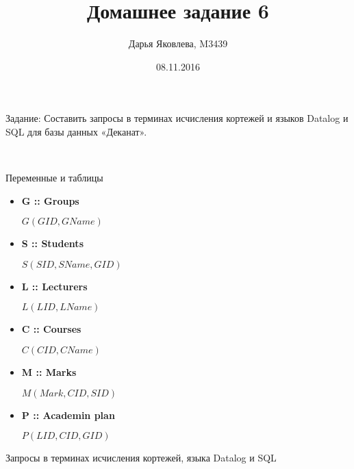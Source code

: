 \documentclass[12pt]{article}
\title{Домашнее задание 6}
\author{Дарья Яковлева, M3439}
\date{08.11.2016}
\begin{document}
\maketitle
\thispagestyle{empty}

Задание: Составить запросы в терминах исчисления кортежей и языков Datalog и SQL для базы данных «Деканат».

~~~

Переменные и таблицы
\begin{itemize}

	\item \textbf{G :: Groups}
	
		$G(GID, GName)$
	\item \textbf{S :: Students}
	
		$S(SID, SName, GID)$
	
	\item \textbf{L :: Lecturers}
	
		$L(LID, LName)$

	\item \textbf{C :: Courses}
	
		$C(CID, CName)$
		
	\item \textbf{M :: Marks}
	
		$M(Mark, CID, SID)$
	
	\item \textbf{P :: Academin plan}
	
		$P(LID, CID, GID)$
		
\end{itemize}

Запросы в терминах исчисления кортежей, языка Datalog и SQL
\end{document}
